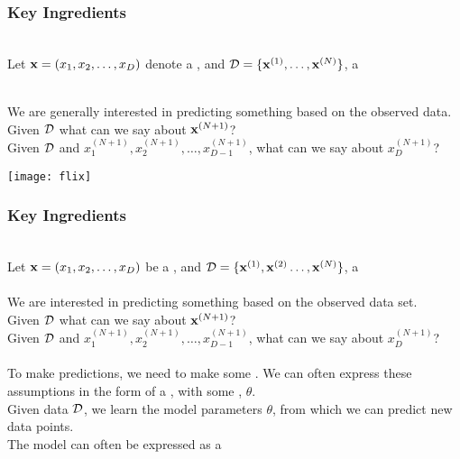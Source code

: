\begin{frame}
\frametitle{Key Ingredients}

\vspace{-1ex}

 \\

Let  $\mathbf x=(x_1, x_2, \ldots, x_D)$ denote a , and $
\mathcal{D} = \{ \mathbf x^{(1)}, \ldots, \mathbf x^{(N)} \} $, a \\[3ex]

\parbox{0.5\textwidth}{
 \\[-0.5ex]

We are generally interested in predicting something based on the observed
data. \\

Given $\mathcal{D}$ what can we say about $\mathbf x^{(N+1)}$?\\

Given $\mathcal{D}$ and $ x^{(N+1)}_1, x^{(N+1)}_2, \ldots,
x^{(N+1)}_{D-1}$, what can we say about $x^{(N+1)}_{D}$?}
\parbox{0.45\textwidth}{\centerline{\texttt{[image: flix]}}}

\end{frame}
\begin{frame}
\frametitle{Key Ingredients}

\vspace{-1ex}

 \\

Let  $\mathbf x=(x_1, x_2, \ldots, x_D)$ be a , and $
\mathcal{D} = \{ \mathbf x^{(1)}, \mathbf x^{(2)} \ldots, \mathbf x^{(N)} \} $, a \\[2ex]

 \\

We are interested in predicting something based on the observed
data set. \\

Given $\mathcal{D}$ what can we say about $\mathbf x^{(N+1)}$?\\

Given $\mathcal{D}$ and $ x^{(N+1)}_1, x^{(N+1)}_2, \ldots,
x^{(N+1)}_{D-1}$, what can we say about $x^{(N+1)}_{D}$? \\[2ex]

\\

To make predictions, we need to make some . 
We can often express these assumptions in the form of a , with
some , $\theta$.\\

Given data $\mathcal{D}$, we learn the model parameters $\theta$, from which we
can predict new data points.\\

The model can often be expressed as a 

\end{frame}
